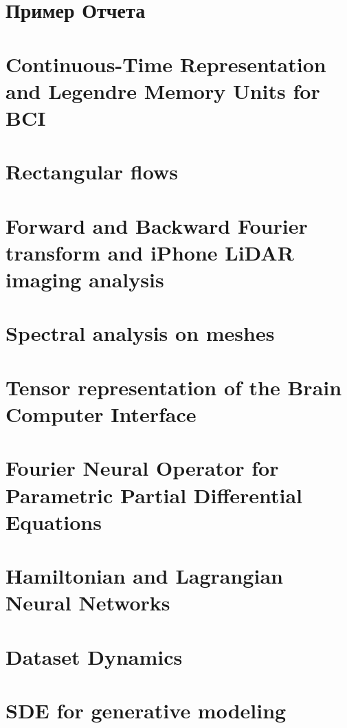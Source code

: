 \documentclass{mybook}
\begin{document}


\setcounter{page}{2}

\newpage
\tableofcontents
    
    \clearpage
    \chapter{Пример Отчета}
    
    
    \clearpage
    \chapter{Continuous-Time Representation and Legendre Memory Units for BCI}
    

    \clearpage
    \chapter{Rectangular flows}
    
    
    \clearpage
    \chapter{Forward and Backward Fourier transform and iPhone LiDAR imaging analysis}
    
    
    \clearpage
    \chapter{Spectral analysis on meshes}
    
    
    \clearpage
    \chapter{Tensor representation of the Brain Computer Interface}
    
    
    \clearpage
    \chapter{Fourier Neural Operator for Parametric Partial Differential Equations}
    
    
    \clearpage
    \chapter{Hamiltonian and Lagrangian Neural Networks}
    

    \clearpage
    \chapter{Dataset Dynamics}
    

    \clearpage
    \chapter{SDE for generative modeling}
    

    \clearpage
    \printbibliography
\end{document}
